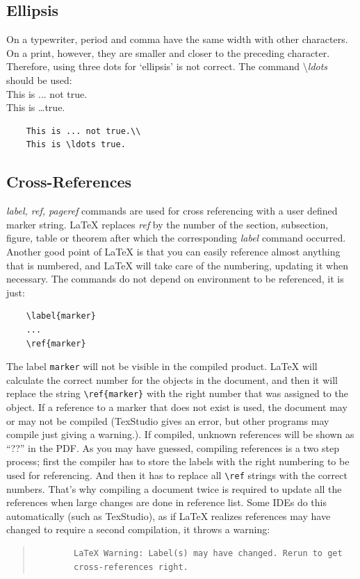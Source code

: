 \documentclass[10pt, a4paper]{article}
\begin{document}
\subsection{Ellipsis}
On a typewriter, period and comma have the same width with other characters. On a print, however, they are smaller and closer to the preceding character. Therefore, using three dots for `ellipsis' is not correct. The command \textbackslash\textsl{ldots} should be used:\\
This is ... not true.\\
This is \ldots true.
\begin{verbatim}
	This is ... not true.\\
	This is \ldots true.
\end{verbatim}
\subsection{Cross-References}
\textsl{label, ref, pageref} commands are used for cross referencing with a user defined marker string. \LaTeX{} replaces \textsl{ref} by the number of the section, subsection, figure, table or theorem after which the corresponding \textsl{label} command occurred. 
Another good point of \LaTeX{} is that you can easily reference almost anything that is numbered, and \LaTeX{} will take care of the numbering, updating it when necessary. The commands do not depend on environment to be referenced, it is just:
\begin{verbatim}
	\label{marker}
	...
	\ref{marker}
\end{verbatim}

The label \texttt{marker} will not be visible in the compiled product. \LaTeX{} will calculate the correct number for the objects in the document, and then it will replace the string \texttt{\textbackslash ref\{marker\}} with the right number that was assigned to the object. If a reference to a marker that does not exist is used, the document may or may not be compiled (TexStudio gives an error, but other programs may compile just giving a warning.). If compiled, unknown references will be shown as ``??'' in the PDF. 
As you may have guessed, compiling references is a two step process; first the compiler has to store the labels with the right numbering to be used for referencing. And then it has to replace all \texttt{\textbackslash ref} strings with the correct numbers. That's why compiling a document twice is required to update all the references when large changes are done in reference list. Some IDEs do this automatically (such as TexStudio), as if \LaTeX{} realizes references may have changed to require a second compilation, it throws a warning:
\begin{quote}
	\begin{verbatim}
		LaTeX Warning: Label(s) may have changed. Rerun to get 
		cross-references right.
	\end{verbatim}
\end{quote}
\end{document}
